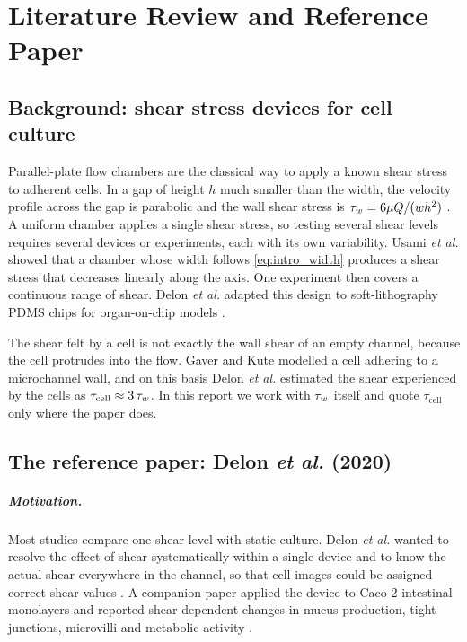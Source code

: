 \chapter{Literature Review and Reference Paper}
\label{ch:lit}

\section{Background: shear stress devices for cell culture}

Parallel-plate flow chambers are the classical way to apply a known shear stress to adherent cells. In a gap of height $h$ much smaller than the width, the velocity profile across the gap is parabolic and the wall shear stress is $\tau_{w}=6\mu Q/(wh^2)$ \citep{Bruus2008,BSL2002}. A uniform chamber applies a single shear stress, so testing several shear levels requires several devices or experiments, each with its own variability. Usami \emph{et al.} \citep{Usami1993} showed that a chamber whose width follows \cref{eq:intro_width} produces a shear stress that decreases linearly along the axis. One experiment then covers a continuous range of shear. Delon \emph{et al.} adapted this design to soft-lithography PDMS chips for organ-on-chip models \citep{Delon2019,Delon2020}.

The shear felt by a cell is not exactly the wall shear of an empty channel, because the cell protrudes into the flow. Gaver and Kute \citep{GaverKute1998} modelled a cell adhering to a microchannel wall, and on this basis Delon \emph{et al.} estimated the shear experienced by the cells as $\tau_{\mathrm{cell}}\approx3\,\tau_{w}$. In this report we work with $\tau_{w}$ itself and quote $\tau_{\mathrm{cell}}$ only where the paper does.

\section{The reference paper: Delon \emph{et al.} (2020)}

\paragraph{Motivation.} Most studies compare one shear level with static culture. Delon \emph{et al.} wanted to resolve the effect of shear systematically within a single device and to know the actual shear everywhere in the channel, so that cell images could be assigned correct shear values \citep{Delon2020}. A companion paper applied the device to Caco-2 intestinal monolayers and reported shear-dependent changes in mucus production, tight junctions, microvilli and metabolic activity \citep{Delon2019}.

